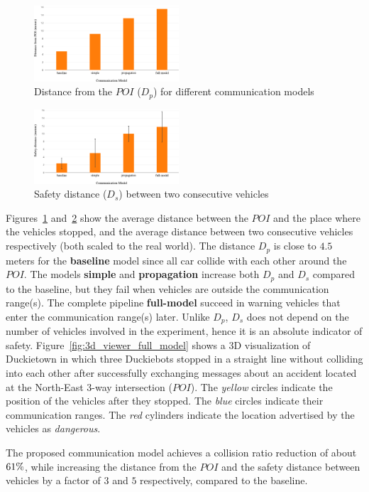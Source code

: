 \begin{figure}[t]
    \centering
    \includegraphics[width=0.48\textwidth, height=0.22\textwidth]{figures/distance_from_POI.pdf}
    \caption{Distance from the $POI$ ($D_p$) for different communication models \label{fig:distance_from_poi}}
\end{figure}

\begin{figure}[t]
    \centering
    \includegraphics[width=0.48\textwidth, height=0.22\textwidth]{figures/safety_distance.pdf}
    \caption{Safety distance ($D_s$) between two consecutive vehicles \label{fig:safety_distance}}
\end{figure}

Figures~\ref{fig:distance_from_poi} and~\ref{fig:safety_distance} show the average distance 
between the $POI$ and the place where the vehicles stopped, and the average distance 
between two consecutive vehicles respectively (both scaled to the real world).
The distance $D_p$ is close to $4.5$ meters for the \textbf{baseline} model since all car collide with each 
other around the $POI$. The models \textbf{simple} and \textbf{propagation} increase both 
$D_p$ and $D_s$ compared to the baseline, but they fail when vehicles are outside the communication range(s).
The complete pipeline \textbf{full-model} succeed in warning vehicles that enter the communication range(s) later.
Unlike $D_p$, $D_s$ does not depend on the number of vehicles involved in the experiment, hence it 
is an absolute indicator of safety. Figure~\ref{fig:3d_viewer_full_model} shows a 3D visualization of Duckietown
in which three Duckiebots stopped in a straight line without colliding into each other
after successfully exchanging messages about an accident located at the North-East 3-way intersection ($POI$).
The \textit{yellow} circles indicate the position of the vehicles after they stopped. 
The \textit{blue} circles indicate their communication ranges. The \textit{red} cylinders 
indicate the location advertised by the vehicles as \textit{dangerous}.

The proposed communication model achieves a collision ratio reduction of about $\collision_ratio_reduction_perc\%$,
while increasing the distance from the $POI$ and the safety distance between vehicles by a factor of 
$3$ and $5$ respectively, compared to the baseline.
